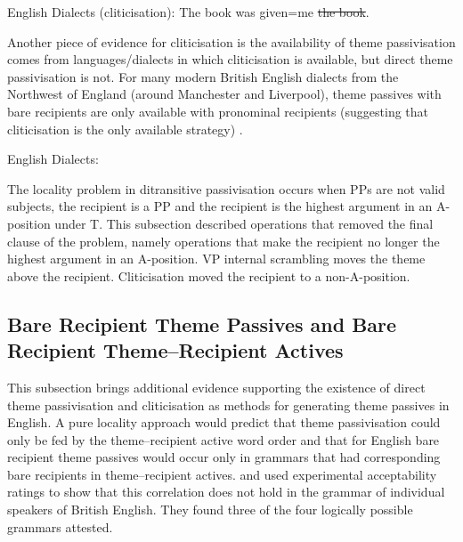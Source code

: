 \begin{exe}
	\ex English Dialects (cliticisation): The book was given=me \sout{the book}.\label{ex:en-clitic}
\end{exe}

Another piece of evidence for cliticisation is the availability of theme passivisation comes from languages/dialects in which cliticisation is available, but direct theme passivisation is not. For many modern British English dialects from the Northwest of England (around Manchester and Liverpool), theme passives with bare recipients are only available with pronominal recipients (suggesting that cliticisation is the only available strategy) \citep{Haddican.2010,Myler.2011,Haddican.2012,Biggs.2015}.

\begin{exe}
	\ex English Dialects:\label{ex:endial-prosens}
	\begin{xlist}
	\end{xlist}
\end{exe}

The locality problem in ditransitive passivisation occurs when PPs are not valid subjects, the recipient is a PP and the recipient is the highest argument in an A-position under T. This subsection described operations that removed the final clause of the problem, namely operations that make the recipient no longer the highest argument in an A-position. VP internal scrambling moves the theme above the recipient. Cliticisation moved the recipient to a non-A-position.

\subsection{Bare Recipient Theme Passives and Bare Recipient Theme--Recipient Actives}
This subsection brings additional evidence supporting the existence of direct theme passivisation and cliticisation as methods for generating theme passives in English. A pure locality approach would predict that theme passivisation could only be fed by the theme--recipient active word order and that for English bare recipient theme passives would occur only in grammars that had corresponding bare recipients in theme--recipient actives. \cite{Haddican.2010} and \cite{Haddican.2011,Haddican.2012} used experimental acceptability ratings to show that this correlation does not hold in the grammar of individual speakers of British English. They found three of the four logically possible grammars attested. 

